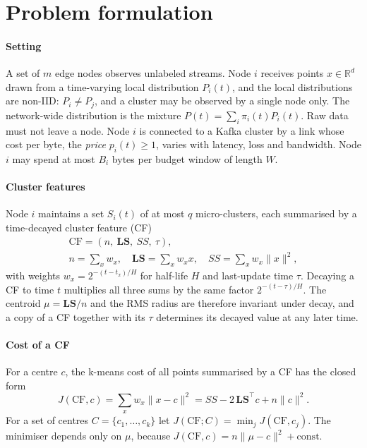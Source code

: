 \section{Problem formulation}\label{sec:problem}

\paragraph{Setting} A set of $m$ edge nodes observes unlabeled streams. Node $i$ receives points $x\in\mathbb{R}^d$ drawn from a time-varying local distribution $P_i(t)$, and the local distributions are non-IID: $P_i\neq P_j$, and a cluster may be observed by a single node only. The network-wide distribution is the mixture $P(t)=\sum_i \pi_i(t)P_i(t)$. Raw data must not leave a node. Node $i$ is connected to a Kafka cluster by a link whose cost per byte, the \emph{price} $p_i(t)\ge 1$, varies with latency, loss and bandwidth. Node $i$ may spend at most $B_i$ bytes per budget window of length $W$.

\paragraph{Cluster features} Node $i$ maintains a set $S_i(t)$ of at most $q$ micro-clusters, each summarised by a time-decayed cluster feature (CF)~\cite{zhang1996birch,aggarwal2003clustream,cao2006denstream}
\begin{equation}
\begin{gathered}
\mathrm{CF}=(n,\ \mathbf{LS},\ SS,\ \tau),\\
n=\textstyle\sum_x w_x,\quad \mathbf{LS}=\sum_x w_x x,\quad SS=\sum_x w_x\lVert x\rVert^2,
\end{gathered}
\end{equation}
with weights $w_x = 2^{-(t-t_x)/H}$ for half-life $H$ and last-update time $\tau$. Decaying a CF to time $t$ multiplies all three sums by the same factor $2^{-(t-\tau)/H}$. The centroid $\mu=\mathbf{LS}/n$ and the RMS radius are therefore invariant under decay, and a copy of a CF together with its $\tau$ determines its decayed value at any later time.

\paragraph{Cost of a CF} For a centre $c$, the k-means cost of all points summarised by a CF has the closed form
\begin{equation}\label{eq:cfcost}
J(\mathrm{CF},c)=\sum_x w_x\lVert x-c\rVert^2 = SS-2\,\mathbf{LS}^\top c+n\lVert c\rVert^2 .
\end{equation}
For a set of centres $C=\{c_1,\dots,c_k\}$ let $J(\mathrm{CF};C)=\min_j J(\mathrm{CF},c_j)$. The minimiser depends only on $\mu$, because $J(\mathrm{CF},c)=n\lVert\mu-c\rVert^2+\text{const}$.

